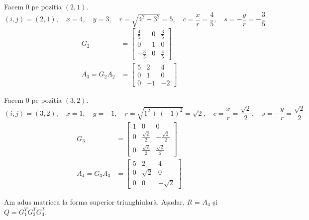 \documentclass{exam}
\begin{document}
Facem 0 pe poziția $(2, 1)$.
\begin{equation*}
	(i, j) = (2, 1), \quad x = 4, \quad y = 3, \quad r = \sqrt{4^2 + 3^2} = 5, \quad c = \frac{x}{r} = \frac{4}{5}, \quad s = -\frac{y}{r} = -\frac{3}{5}
\end{equation*}
\begin{align*}
	G_2           & = \begin{bmatrix}
		                  \frac{4}{5}  & 0 & \frac{3}{5} \\
		                  0            & 1 & 0           \\
		                  -\frac{3}{5} & 0 & \frac{4}{5}
	                  \end{bmatrix} \\
	A_3 = G_2 A_2 & = \begin{bmatrix}
		                  5 & 2  & 4  \\
		                  0 & 1  & 0  \\
		                  0 & -1 & -2
	                  \end{bmatrix}
\end{align*}

Facem 0 pe poziția $(3, 2)$.
\begin{equation*}
	(i, j) = (3, 2), \quad x = 1, \quad y = -1, \quad r = \sqrt{1^2 + (-1)^2} = \sqrt{2}, \quad c = \frac{x}{r} = \frac{\sqrt{2}}{2}, \quad s = -\frac{y}{r} = \frac{\sqrt{2}}{2}
\end{equation*}
\begin{align*}
	G_3           & = \begin{bmatrix}
		                  1 & 0                  & 0                   \\
		                  0 & \frac{\sqrt{2}}{2} & -\frac{\sqrt{2}}{2} \\
		                  0 & \frac{\sqrt{2}}{2} & \frac{\sqrt{2}}{2}
	                  \end{bmatrix} \\
	A_4 = G_3 A_3 & = \begin{bmatrix}
		                  5 & 2        & 4         \\
		                  0 & \sqrt{2} & 0         \\
		                  0 & 0        & -\sqrt{2}
	                  \end{bmatrix}
\end{align*}

Am adus matricea la forma superior triunghiulară. Așadar, $R$ = $A_4$ și
$Q = G_1^T G_2^T G_3^T$.
\end{document}
